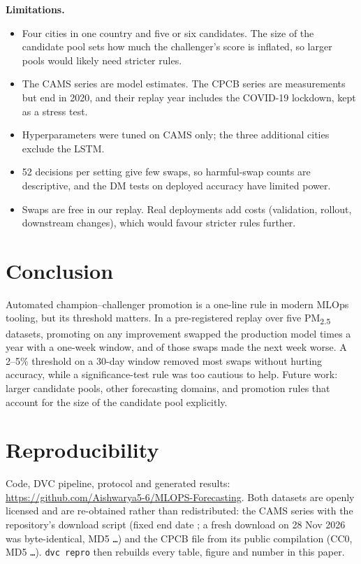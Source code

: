 \documentclass[conference]{IEEEtran}
\newif\ifextended
\begin{document}
\textbf{Limitations.}
\begin{itemize}
  \item Four cities in one country and five or six candidates. The size of the candidate pool sets
        how much the challenger's score is inflated, so larger pools would likely need stricter rules.
  \item The CAMS series are model estimates. The CPCB series are measurements but end in 2020, and
        their replay year includes the COVID-19 lockdown, kept as a stress test.
  \item Hyperparameters were tuned on CAMS only; the three additional cities exclude the LSTM.
  \item 52 decisions per setting give few swaps, so harmful-swap counts are descriptive, and the
        DM tests on deployed accuracy have limited power.
  \item Swaps are free in our replay. Real deployments add costs (validation, rollout, downstream
        changes), which would favour stricter rules further.
\end{itemize}

\section{Conclusion}

Automated champion--challenger promotion is a one-line rule in modern MLOps tooling, but its
threshold matters. In a pre-registered replay over five PM\textsubscript{2.5} datasets, promoting
on any improvement swapped the production model  times a year with a
one-week window, and  of those swaps made the next week worse. A 2--5\% threshold on a 30-day window
removed most swaps without hurting accuracy, while a significance-test rule was too cautious to
help. Future work: larger candidate pools, other forecasting domains, and promotion rules that
account for the size of the candidate pool explicitly.

\ifextended\else
\section*{Reproducibility}
Code, DVC pipeline, protocol and generated results: \url{https://github.com/Aishwarya5-6/MLOPS-Forecasting}.
Both datasets are openly licensed and are re-obtained rather than redistributed: the CAMS series
with the repository's download script (fixed end date ; a fresh download on 28 Nov
2026 was byte-identical, MD5 \texttt{\ldots}) and the CPCB file from its public
compilation (CC0, MD5 \texttt{\ldots}). \texttt{dvc repro} then rebuilds every
table, figure and number in this paper.
\fi
\end{document}

